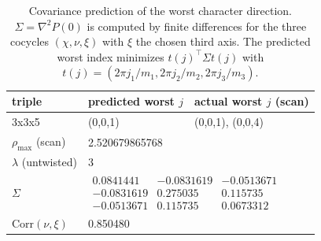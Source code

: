 \begin{table}[H]
\centering
\scriptsize
\setlength{\tabcolsep}{6pt}
\caption{Covariance prediction of the worst character direction. $\Sigma=\nabla^2 P(0)$ is computed by finite differences for the three cocycles $(\chi,\nu,\xi)$ with $\xi$ the chosen third axis. The predicted worst index minimizes $t(j)^\top\Sigma t(j)$ with $t(j)=(2\pi j_1/m_1,2\pi j_2/m_2,2\pi j_3/m_3)$.}
\label{tab:real_input_40_covariance_worst_character}
\begin{tabular}{l l l}
\toprule
triple & predicted worst $j$ & actual worst $j$ (scan)\\
\midrule
3x3x5 & (0,0,1) & (0,0,1), (0,0,4)\\
\midrule
$\rho_{\max}$ (scan) & \multicolumn{2}{l}{2.520679865768}\\
$\lambda$ (untwisted) & \multicolumn{2}{l}{3}\\
\midrule
$\Sigma$ & \multicolumn{2}{l}{$\begin{smallmatrix}0.0841441&-0.0831619&-0.0513671\\-0.0831619&0.275035&0.115735\\-0.0513671&0.115735&0.0673312\end{smallmatrix}$}\\
$\mathrm{Corr}(\nu,\xi)$ & \multicolumn{2}{l}{0.850480}\\
\bottomrule
\end{tabular}
\end{table}
